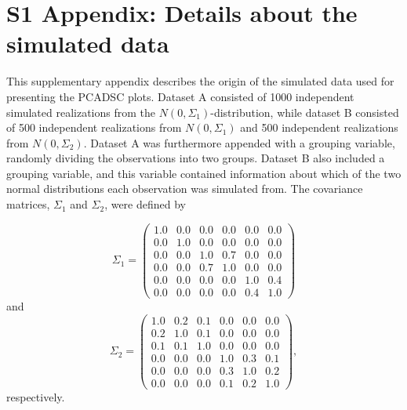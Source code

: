 \documentclass{article}
\begin{document}
\section*{S1 Appendix: Details about the simulated data}
This supplementary appendix describes the origin of the simulated data used for presenting the PCADSC plots. Dataset A consisted of 1000 independent simulated realizations from the $N(0, \Sigma_1)$-distribution, while dataset B consisted of 500 independent realizations from $N(0, \Sigma_1)$ and 500 independent realizations from $N(0, \Sigma_2)$. Dataset A was furthermore appended with a grouping variable, randomly dividing the observations into two groups. Dataset B also included a grouping variable, and this variable contained information about which of the two normal distributions each observation was simulated from. The covariance matrices, $\Sigma_1$ and $\Sigma_2$, were defined by

$$\Sigma_1 = \begin{pmatrix}
    1.0  &  0.0 & 0.0 & 0.0 & 0.0 & 0.0 \\
 0.0  &  1.0 & 0.0 & 0.0&  0.0 & 0.0 \\
 0.0   & 0.0 &  1.0 & 0.7 & 0.0 & 0.0 \\
 0.0 &  0.0 & 0.7 & 1.0 & 0.0 & 0.0 \\
0.0 &    0.0 &  0.0 & 0.0 & 1.0 & 0.4 \\
 0.0 & 0.0 &  0.0 & 0.0 & 0.4 & 1.0
\end{pmatrix}$$
and
$$
\Sigma_2 = \begin{pmatrix}
 1.0 & 0.2 & 0.1 & 0.0 & 0.0 & 0.0 \\
 0.2 & 1.0 & 0.1 & 0.0 & 0.0 & 0.0 \\
 0.1 & 0.1 & 1.0 & 0.0 & 0.0 & 0.0 \\
 0.0 & 0.0 & 0.0 & 1.0 & 0.3 & 0.1 \\
 0.0 & 0.0 & 0.0 & 0.3 & 1.0 & 0.2 \\
 0.0 & 0.0 & 0.0 & 0.1 & 0.2 & 1.0
\end{pmatrix},
$$
respectively.
\end{document}
